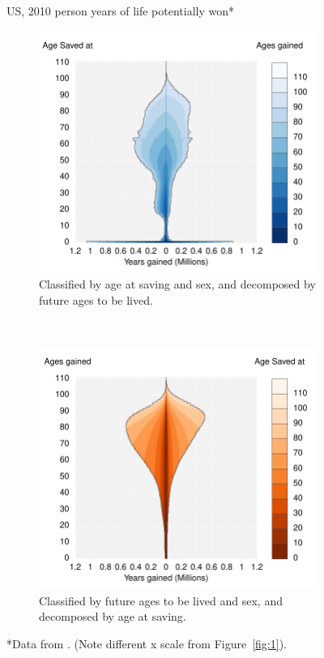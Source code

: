 \documentclass{article}
\begin{document}
\begin{figure}
\centering
\caption{US, 2010 person years of life potentially won*}
\label{fig:2}
\begin{subfigure}[b]{.48\linewidth}
\centering
	\caption{Classified by age at saving and sex, and decomposed by future ages to
	be lived.}
	\label{fig:SavedGained}
	\includegraphics[scale=.55]{Figures/YearsSavedGainedxx10.pdf}	
\end{subfigure}
~
\begin{subfigure}[b]{.48\linewidth}
\centering
    \caption{Classified by future ages to be lived and sex, and decomposed by age at saving.}
	\label{fig:LostLived}
    \includegraphics[scale=.55]{Figures/YearsLostLivedyx10.pdf}
\end{subfigure}
\caption*{*Data from . (Note different x scale from
Figure~\ref{fig:1}).}
\end{figure}
\end{document}
